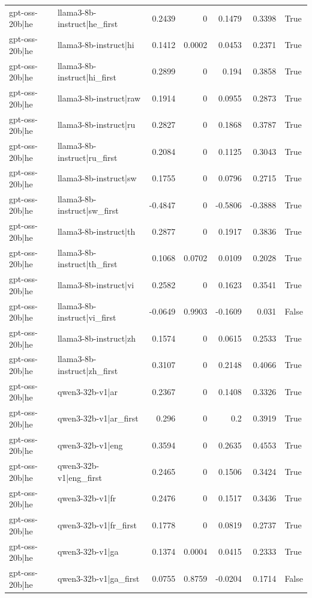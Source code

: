 \begin{table}
\begin{tabular}{l l r r r r l}
gpt-oss-20b|he & llama3-8b-instruct|he_first & 0.2439 & 0 & 0.1479 & 0.3398 & True \\
gpt-oss-20b|he & llama3-8b-instruct|hi & 0.1412 & 0.0002 & 0.0453 & 0.2371 & True \\
gpt-oss-20b|he & llama3-8b-instruct|hi_first & 0.2899 & 0 & 0.194 & 0.3858 & True \\
gpt-oss-20b|he & llama3-8b-instruct|raw & 0.1914 & 0 & 0.0955 & 0.2873 & True \\
gpt-oss-20b|he & llama3-8b-instruct|ru & 0.2827 & 0 & 0.1868 & 0.3787 & True \\
gpt-oss-20b|he & llama3-8b-instruct|ru_first & 0.2084 & 0 & 0.1125 & 0.3043 & True \\
gpt-oss-20b|he & llama3-8b-instruct|sw & 0.1755 & 0 & 0.0796 & 0.2715 & True \\
gpt-oss-20b|he & llama3-8b-instruct|sw_first & -0.4847 & 0 & -0.5806 & -0.3888 & True \\
gpt-oss-20b|he & llama3-8b-instruct|th & 0.2877 & 0 & 0.1917 & 0.3836 & True \\
gpt-oss-20b|he & llama3-8b-instruct|th_first & 0.1068 & 0.0702 & 0.0109 & 0.2028 & True \\
gpt-oss-20b|he & llama3-8b-instruct|vi & 0.2582 & 0 & 0.1623 & 0.3541 & True \\
gpt-oss-20b|he & llama3-8b-instruct|vi_first & -0.0649 & 0.9903 & -0.1609 & 0.031 & False \\
gpt-oss-20b|he & llama3-8b-instruct|zh & 0.1574 & 0 & 0.0615 & 0.2533 & True \\
gpt-oss-20b|he & llama3-8b-instruct|zh_first & 0.3107 & 0 & 0.2148 & 0.4066 & True \\
gpt-oss-20b|he & qwen3-32b-v1|ar & 0.2367 & 0 & 0.1408 & 0.3326 & True \\
gpt-oss-20b|he & qwen3-32b-v1|ar_first & 0.296 & 0 & 0.2 & 0.3919 & True \\
gpt-oss-20b|he & qwen3-32b-v1|eng & 0.3594 & 0 & 0.2635 & 0.4553 & True \\
gpt-oss-20b|he & qwen3-32b-v1|eng_first & 0.2465 & 0 & 0.1506 & 0.3424 & True \\
gpt-oss-20b|he & qwen3-32b-v1|fr & 0.2476 & 0 & 0.1517 & 0.3436 & True \\
gpt-oss-20b|he & qwen3-32b-v1|fr_first & 0.1778 & 0 & 0.0819 & 0.2737 & True \\
gpt-oss-20b|he & qwen3-32b-v1|ga & 0.1374 & 0.0004 & 0.0415 & 0.2333 & True \\
gpt-oss-20b|he & qwen3-32b-v1|ga_first & 0.0755 & 0.8759 & -0.0204 & 0.1714 & False \\

\end{tabular}
\end{table}
